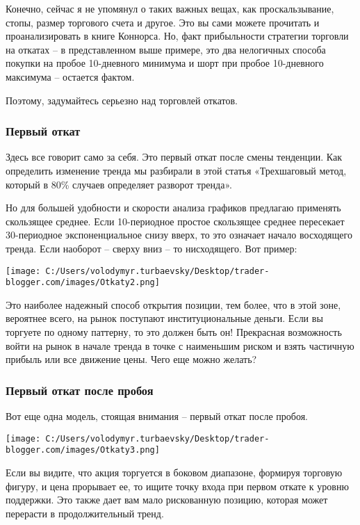 \documentclass[a5paper]{article}
\begin{document}
Конечно, сейчас я не упомянул о таких важных вещах, как проскальзывание, стопы, размер торгового счета и другое. Это вы сами можете прочитать и проанализировать в книге Коннорса. Но, факт прибыльности стратегии торговли на откатах – в представленном выше примере, это два нелогичных способа покупки на пробое 10-дневного минимума и шорт при пробое 10-дневного максимума – остается фактом.

Поэтому, задумайтесь серьезно над торговлей откатов.

\subsubsection{Первый откат}

Здесь все говорит само за себя. Это первый откат после смены тенденции. Как определить изменение тренда мы разбирали в этой статья «Трехшаговый метод, который в 80\% случаев определяет разворот тренда».

Но для большей удобности и скорости анализа графиков предлагаю
применять скользящее среднее. Если 10-периодное простое скользящее
среднее пересекает 30-периодное экспоненциальное снизу вверх, то это
означает начало восходящего тренда. Если наоборот – сверху вниз – то
нисходящего. Вот пример:

\texttt{[image: C:/Users/volodymyr.turbaevsky/Desktop/trader-blogger.com/images/Otkaty2.png]}

Это наиболее надежный способ открытия позиции, тем более, что в этой
зоне, вероятнее всего, на рынок поступают институциональные
деньги. Если вы торгуете по одному паттерну, то это должен быть он!
Прекрасная возможность войти на рынок в начале тренда в точке с
наименьшим риском и взять частичную прибыль или все движение
цены. Чего еще можно желать?

\subsubsection{Первый откат после пробоя}

Вот еще одна модель, стоящая внимания – первый откат после пробоя.

\texttt{[image: C:/Users/volodymyr.turbaevsky/Desktop/trader-blogger.com/images/Otkaty3.png]}

Если вы видите, что акция торгуется в боковом диапазоне, формируя торговую фигуру, и цена прорывает ее, то ищите точку входа при первом откате к уровню поддержки. Это также дает вам мало рискованную позицию, которая может перерасти в продолжительный тренд.
\end{document}
